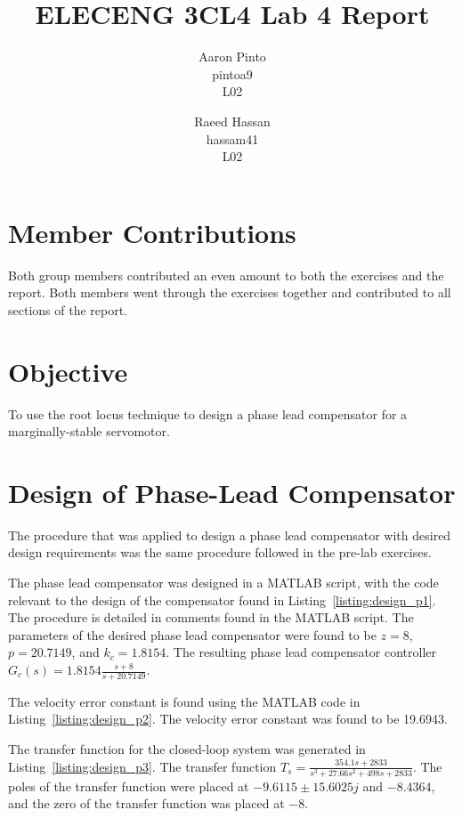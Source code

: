 \documentclass[12pt]{article}
\title{ELECENG 3CL4 Lab 4 Report}
\author{
    Aaron Pinto \\
    pintoa9 \\
    L02
    \and
    Raeed Hassan \\
    hassam41 \\
    L02
}
\begin{document}
\maketitle
\clearpage

\section*{Member Contributions} %
Both group members contributed an even amount to both the exercises and the report. Both members went through the exercises together and contributed to all sections of the report.

\section*{Objective} %
To use the root locus technique to design a phase lead compensator for a marginally-stable servomotor.

\setcounter{section}{1}
\section{Design of Phase-Lead Compensator}
The procedure that was applied to design a phase lead compensator with desired design requirements was the same procedure followed in the pre-lab exercises.

The phase lead compensator was designed in a MATLAB script, with the code relevant to the design of the compensator found in Listing~\ref{listing:design_p1}. The procedure is detailed in comments found in the MATLAB script. The parameters of the desired phase lead compensator were found to be $z = 8$, $p = 20.7149$, and $k_c = 1.8154$. The resulting phase lead compensator controller $G_c(s) = 1.8154 \frac{s + 8}{s + 20.7149}$. 



The velocity error constant is found using the MATLAB code in Listing~\ref{listing:design_p2}. The velocity error constant was found to be 19.6943.



The transfer function for the closed-loop system was generated in Listing~\ref{listing:design_p3}. The transfer function $T_s = \frac{354.1s + 2833}{s^3 + 27.66s^2 + 498s + 2833}$. The poles of the transfer function were placed at $-9.6115 \pm 15.6025j$ and $-8.4364$, and the zero of the transfer function was placed at $-8$.
\end{document}
